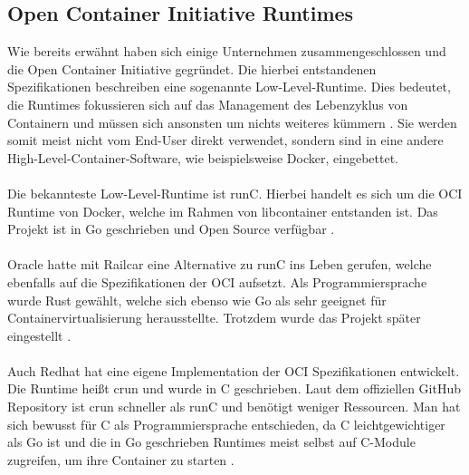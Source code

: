 \subsection{Open Container Initiative Runtimes}
Wie bereits erwähnt haben sich einige Unternehmen zusammengeschlossen und die Open Container Initiative gegründet. Die hierbei entstandenen Spezifikationen beschreiben eine sogenannte Low-Level-Runtime. Dies bedeutet, die Runtimes fokussieren sich auf das Management des Lebenzyklus von Containern und müssen sich ansonsten um nichts weiteres kümmern \cite{evan_baker_comprehensive_2021}. Sie werden somit meist nicht vom End-User direkt verwendet, sondern sind in eine andere High-Level-Container-Software, wie beispielsweise Docker, eingebettet.
\\\\
Die bekannteste Low-Level-Runtime ist runC. Hierbei handelt es sich um die OCI Runtime von Docker, welche im Rahmen von libcontainer entstanden ist. Das Projekt ist in Go geschrieben und Open Source verfügbar \cite{evan_baker_comprehensive_2021}.
\\\\
Oracle hatte mit Railcar eine Alternative zu runC ins Leben gerufen, welche ebenfalls auf die Spezifikationen der OCI aufsetzt. Als Programmiersprache wurde Rust gewählt, welche sich ebenso wie Go als sehr geeignet für Containervirtualisierung herausstellte. Trotzdem wurde das Projekt später eingestellt \cite{evan_baker_comprehensive_2021}.
\\\\
Auch Redhat hat eine eigene Implementation der OCI Spezifikationen entwickelt. Die Runtime heißt crun und wurde in C geschrieben. Laut dem offiziellen GitHub Repository ist crun schneller als runC und benötigt weniger Ressourcen. Man hat sich bewusst für C als Programmiersprache entschieden, da C leichtgewichtiger als Go ist und die in Go geschrieben Runtimes meist selbst auf C-Module zugreifen, um ihre Container zu starten \cite{noauthor_crun_2021}.

